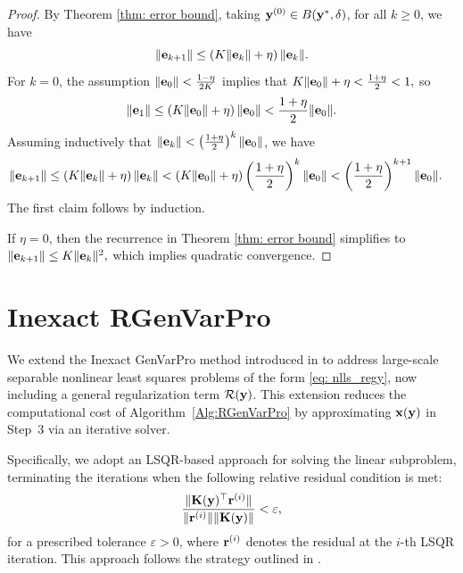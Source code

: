 \documentclass[onefignum,onetabnum]{siamart171218}
\newcommand{\bK}{{\bf K}}
\newcommand{\be}{{\bf e}}
\newcommand{\br}{{\bf r}}
\newcommand{\bx}{{\bf x}}
\newcommand{\by}{{\bf y}}
\begin{document}
\begin{proof}
By Theorem \ref{thm: error bound}, taking $\by^{(0)} \in B(\by^*, \delta)$, for all $k\ge 0$, we have
\[
\|\be_{k+1}\| \leq  \left( K \|\be_k\| + \eta \right) \|\be_k\|. 
\]
For $k = 0$, the assumption
$
 \|\be_0\| < \frac{1 - \eta}{2K}$ implies that
$K \|\be_0\| + \eta < \frac{1 + \eta}{2} < 1,$
so
\[
\|\be_1\| \leq \left( K \|\be_0\| + \eta \right) \|\be_0\| < \frac{1 + \eta}{2} \|\be_0\|.
\]
Assuming inductively that $\|\be_k\| < \left( \frac{1 + \eta}{2} \right)^k \|\be_0\|$, we have
\begin{align*}
\|\be_{k+1}\| \leq \left( K \|\be_k\| + \eta \right) \|\be_k\| 
& < \left( K \|\be_0\| + \eta \right) \left( \frac{1 + \eta}{2} \right)^k \|\be_0\| 
< \left( \frac{1 + \eta}{2} \right)^{k+1} \|\be_0\|.
\end{align*}
The first claim follows by induction.

If $\eta = 0$, then the recurrence in Theorem \ref{thm: error bound} simplifies to
$
\|\be_{k+1}\| \leq K \|\be_k\|^2,
$
which implies quadratic convergence.
\end{proof}


\section{Inexact RGenVarPro}\label{section:iRGenVarPro}
We extend the Inexact GenVarPro method introduced in \cite{espanol2025local} to address large-scale separable nonlinear least squares problems of the form \eqref{eq: nlls_regy}, now including a general regularization term $\mathcal{R}(\by)$. This extension reduces the computational cost of Algorithm~\ref{Alg:RGenVarPro} by approximating $\bx(\by)$ in Step~3 via an iterative solver.

Specifically, we adopt an LSQR-based approach for solving the linear subproblem, terminating the iterations when the following relative residual condition is met:
\begin{equation}\label{eq: stopping_criterion}
\frac{\|\bK(\by)^\top \br^{(i)}\|}{\|\br^{(i)}\| \|\bK(\by)\|} < \varepsilon,
\end{equation}
for a prescribed tolerance $\varepsilon > 0$, where $\br^{(i)}$ denotes the residual at the $i$-th LSQR iteration. This approach follows the strategy outlined in \cite{espanol2025local}.
\end{document}

